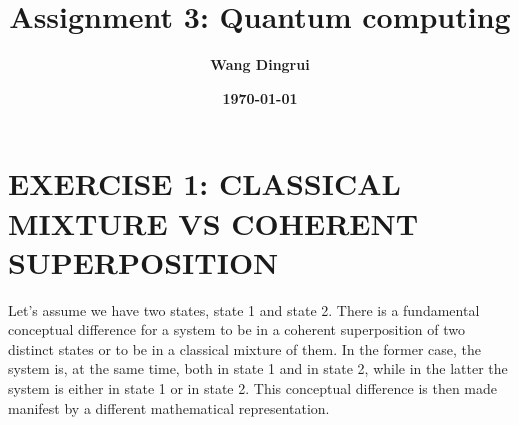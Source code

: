 \documentclass[12pt]{article}
\title{\textbf{Assignment 3: Quantum computing}}
\author{\textbf{Wang Dingrui}}
\date{\textbf{\today}}
\begin{document}
\maketitle

\section{EXERCISE 1: CLASSICAL MIXTURE VS COHERENT SUPERPOSITION}
Let's assume we have two states, state 1 and state 2. There is a fundamental conceptual difference for a system to be in a coherent superposition of two distinct states or to be in a classical mixture of them. In the former case, the system is, at the same time, both in state 1 and in state 2, while in the latter the system is either in state 1 or in state 2. This conceptual difference is then made manifest by a different mathematical representation.
\end{document}
